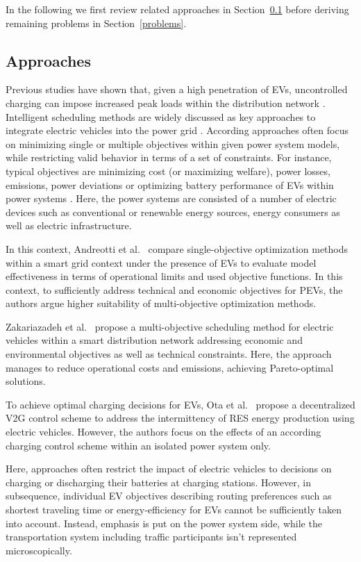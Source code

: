 \documentclass[conference]{IEEEtran}
\begin{document}
	In the following we first review related approaches in Section~\ref{approaches} before deriving remaining problems in Section~\ref{problems}.
	
	\subsection{Approaches}
	\label{approaches}
		
	Previous studies have shown that, given a high penetration of EVs, uncontrolled charging can impose increased peak loads within the distribution network \cite{lopes2009identifying}. Intelligent scheduling methods are widely discussed as key approaches to integrate electric vehicles into the power grid \cite{yang2015computational}. According approaches often focus on minimizing single or multiple objectives within given power system models, while restricting valid behavior in terms of a set of constraints. For instance, typical objectives are minimizing cost (or maximizing welfare), power losses, emissions, power deviations or optimizing battery performance of EVs within power systems \cite{yang2015computational}. Here, the power systems are consisted of a number of electric devices such as conventional or renewable energy sources, energy consumers as well as electric infrastructure.
	
	In this context, Andreotti et al.~\cite{andreotti2012review} compare single-objective optimization methods within a smart grid context under the presence of EVs to evaluate model effectiveness in terms of operational limits and used objective functions. In this context, to sufficiently address technical and economic objectives for PEVs, the authors argue higher suitability of multi-objective optimization methods. 
	
	Zakariazadeh et al.~\cite{zakariazadeh2014multi} propose a multi-objective scheduling method for electric vehicles within a smart distribution network addressing economic and environmental objectives as well as technical constraints. Here, the approach manages to reduce operational costs and emissions, achieving Pareto-optimal solutions.
	
	To achieve optimal charging decisions for EVs, Ota et al.~\cite{ota2012autonomous} propose a decentralized V2G control scheme to address the intermittency of RES energy production using electric vehicles. However, the authors focus on the effects of an according charging control scheme within an isolated power system only.
	
	Here, approaches often restrict the impact of electric vehicles to decisions on charging or discharging their batteries at charging stations. However, in subsequence, individual EV objectives describing routing preferences such as shortest traveling time or energy-efficiency for EVs cannot be sufficiently taken into account. Instead, emphasis is put on the power system side, while the transportation system including traffic participants isn't represented microscopically. 
	
\end{document}
